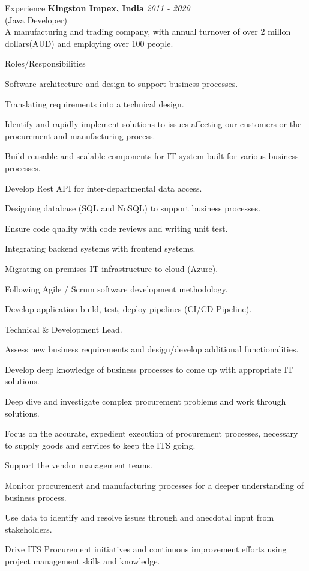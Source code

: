 \documentclass{resume}
\begin{document}
\begin{rSection}{Experience}
{\bf Kingston Impex, India} \hfill {\em  2011 - 2020} 
\\(Java Developer)
\\A manufacturing and trading company, with annual turnover of over 2 millon dollars(AUD) and employing over 100 people.

\begin{rSubsection}{Roles/Responsibilities}{}{}{}
\item Software architecture and design to support business processes.
\item Translating requirements into a technical design.
\item Identify and rapidly implement solutions to issues affecting our customers or the procurement and manufacturing process.
\item Build reusable and scalable components for IT system built for various business processes.
\item Develop Rest API for inter-departmental data access.
\item Designing database (SQL and NoSQL) to support business processes.
\item Ensure code quality with code reviews and writing unit test.
\item Integrating backend systems with frontend systems.
\item Migrating on-premises IT infrastructure to cloud (Azure).
\item Following Agile / Scrum software development methodology.
\item Develop application build, test, deploy pipelines (CI/CD Pipeline).
\item Technical \& Development Lead.
\item Assess new business requirements and design/develop additional functionalities.
\item Develop deep knowledge of business processes to come up with appropriate IT solutions. 
\item Deep dive and investigate complex procurement problems and work through solutions.
\item Focus on the accurate, expedient execution of procurement processes, necessary to supply goods and services to keep the ITS going.
\item Support the vendor management teams.
\item Monitor procurement and manufacturing processes for a deeper understanding of business process.
\item Use data to identify and resolve issues through and anecdotal input from stakeholders.
\item Drive ITS Procurement initiatives and continuous improvement efforts using project management skills and knowledge.
\end{rSubsection}


\end{rSection}
\end{document}
